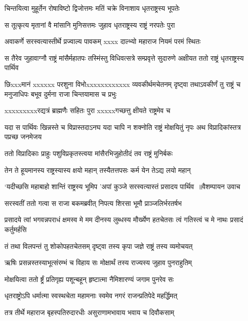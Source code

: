 \twolineshloka
{चिन्तयित्वा मुहूर्तेन रोषाविष्टो द्विजोत्तमः}
{मतिं चक्रे विनाशाय धृतराष्ट्रस्य भूपतेः}


\twolineshloka
{स तूत्कृत्य मृतानां वै मांसानि मुनिसत्तमः}
{जुहाव धृतराष्ट्रस्य राष्ट्रं नरपतेः पुरा}


\twolineshloka
{अवाकर्णे सरस्वत्यास्तीर्थे प्रज्वाल्य पावकम्}
{xxxx दाल्भ्यो महाराज नियमं परमं स्थितः}


स तैरेव जुहावाग्नौ राष्ट्रं मांसैर्महातपः
\twolineshloka
{तस्मिंस्तु विधिवत्सत्रे सम्प्रवृत्ते सुदारुणे}
{अक्षीयत ततो राष्ट्रं धृतराष्ट्रस्य पार्थिव}


छिxxxमानं xxxxxx परशुना विभोxxxxxxxxxxxx व्यवकीर्थमचेतनम्
\twolineshloka
{दृष्ट्वा तथाऽवकीर्णं तु राष्ट्रं च मनुजाधिपः}
{बभूव दुर्मना राजा चिन्तयामास च प्रभुः}


\twolineshloka
{xxxxxxxxxरद्यत्रं ब्राह्मणैः सहितः पुरा}
{xxxxxगच्छत्तु क्षीयते राष्ट्रमेव च}


यदा स पार्थिवः खिन्नस्ते च विप्रास्तदाऽनघ
\twolineshloka
{यदा चापि न शक्नोति राष्ट्रं मोक्षयितुं नृपः}
{अथ विप्रादिकांस्तत्र पप्रच्छ जनमेजय}


\twolineshloka
{ततो विप्रादिकाः प्राहुः पशुविप्रकृतस्त्वया}
{मांसैरभिजुहोतीदं तव राष्ट्रं मुनिर्बकः}


\twolineshloka
{तेन ते हूयमानस्य राष्ट्रस्यास्य क्षयो महान्}
{तस्यैतत्तपसः कर्म येन तेऽद्य लयो महान्}


\threelineshloka
{`यदीच्छसि महाबाहो शान्तिं राष्ट्रस्य भूमिप}
{'अपां कुञ्जे सरस्वत्यास्तं प्रसादय पार्थिव ॥वैशम्पायन उवाच}
{}


\twolineshloka
{सरस्वतीं ततो गत्वा स राजा बकमब्रवीत्}
{निपत्य शिरसा भूमौ प्राञ्जलिर्भरतर्षभ}


\threelineshloka
{प्रसादये त्वां भगवन्नपराधं क्षमस्व मे}
{मम दीनस्य लुब्धस्य मौर्ख्येण हतचेतसः}
{त्वं गतिस्त्वं च मे नाथः प्रसादं कर्तुमर्हसि}


\twolineshloka
{तं तथा विलपन्तं तु शोकोपहतचेतसम्}
{दृष्ट्वा तस्य कृपा जज्ञे राष्ट्रं तस्य व्यमोचयत्}


\twolineshloka
{ऋषिः प्रसन्नस्तस्याभूत्संरम्भं च विहाय सः}
{मोक्षार्थं तस्य राज्यस्य जुहाव पुनराहुतिम्}


\twolineshloka
{मोक्षयित्वा ततो र्ष्ट्रं प्रतिगृह्य पशून्बहून्}
{हृष्टात्मा नैमिशारण्यं जगाम पुनरेव सः}


\twolineshloka
{धृतराष्ट्रोऽपि धर्मात्मा स्वस्थचेता महामनाः}
{स्वमेव नगरं राजन्प्रतिपेदे महर्द्धिमत्}


\twolineshloka
{तत्र तीर्थे महाराज बृहस्पतिरुदारधीः}
{असुराणामभावाय भवाय च दिवौकसाम्}


